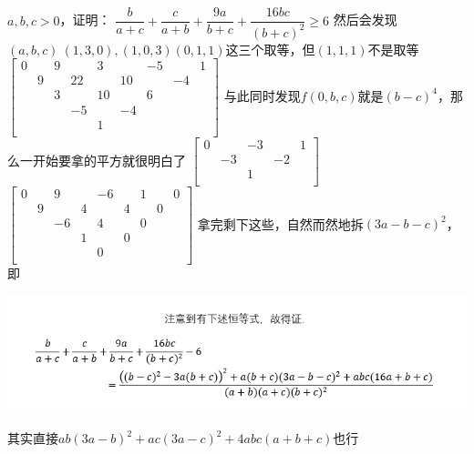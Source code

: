 \documentclass[UTF8]{ctexart}
\begin{document}
\subsection{}$ a,b,c> 0 $，证明：
$ \dfrac{b}{a+c}+\dfrac{c}{a+b}+\dfrac{9a}{b+c}+\dfrac{16bc}{(b+c)^{2}} \geq 6$
然后会发现$ (a,b,c)~(1,3,0),(1,0,3)(0,1,1) $这三个取等，但$ (1,1,1) $不是取等
$ \left[\begin{matrix}
	0& &9& &3& &-5& &1\\
	&9& &22& &10& &-4&\\
	& &3& &10& &6& &\\
	& & &-5& &-4& & &\\
	& & & &1& & & &\\
\end{matrix}\right] $
与此同时发现$ f(0,b,c) $就是$ (b-c)^4 $，那么一开始要拿的平方就很明白了
$ \left[\begin{matrix}
	0& &-3& &1\\
	&-3& &-2&\\
	& &1& &\\
\end{matrix}\right] $
$ \left[\begin{matrix}
	0& &9& &-6& &1& &0\\
	&9& &4& &4& &0&\\
	& &-6& &4& &0& &\\
	& & &1& &0& & &\\
	& & & &0& & & &\\
\end{matrix}\right] $
拿完剩下这些，自然而然地拆$ (3a-b-c)^{2} $，即
\begin{center}
	\includegraphics[width=1\linewidth]{a32}
\end{center}
其实直接$ ab(3a-b)^{2}+ac(3a-c)^{2}+4abc(a+b+c) $也行
\end{document}
